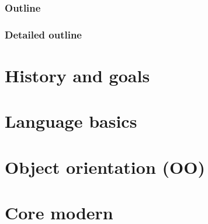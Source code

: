 \documentclass[compress]{beamer}
\begin{document}
\begin{frame}
  \frametitle{Outline}
  \begin{multicols}{2}
    \tableofcontents[sectionstyle=show,subsectionstyle=hide]
  \end{multicols}
\end{frame}

\begin{frame}
  \frametitle{Detailed outline}
  \begin{tiny}
    \begin{multicols}{3}
      \tableofcontents[sectionstyle=show,subsectionstyle=show]
    \end{multicols}
  \end{tiny}
\end{frame}

\section[Intro]{History and goals}



\section[base]{Language basics}













\section[OO]{Object orientation (OO)}









\begin{advanced}
  
\end{advanced}

\section[More]{Core modern \cpp}

\begin{advanced}
  
\end{advanced}
\end{document}
